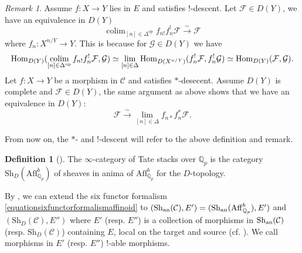 \documentclass[a4paper,10pt]{amsart}
\theoremstyle{remark}
\newtheorem{remark}[theorem]{Remark}
\theoremstyle{definition}
\newtheorem{definition}[theorem]{Definition}
\theoremstyle{plain}
\numberwithin{equation}{section}
\newcommand{\bbQ}{{\mathbb Q}}
\newcommand{\calC}{{\mathcal C}}
\newcommand{\calF}{{\mathcal F}}
\newcommand{\calG}{{\mathcal G}}
\newcommand{\an}{{\rm an}}
\newcommand{\Hom}{{\rm Hom}}
\newcommand{\AffQp}{{\mathrm{Aff}^b_{\mathbb{Q}_p}}}
\newcommand{\Sh}{{\mathrm{Sh}}}
\DeclareMathOperator{\colim}{colim}
\begin{document}
\begin{remark}\label{remarkDtopo}
	Assume $f:X\to Y$ lies in $E$ and satisfies $!$-descent. Let $\calF\in D(Y)$, we have an equivalence in $D(Y)$
	$$\colim_{[n]\in \Delta^{\mathrm{op}}} f_{n!}f_n^!\calF\stackrel{\sim}\longrightarrow \calF$$ 
	 where $f_n: X^{n/Y}\to Y$. This is because for $\calG\in D(Y)$ we have
	$$\Hom_{D(Y)}(\colim_{[n] \in \Delta^{\mathrm{op}}} f_{n!}f_n^!\calF,\calG)\simeq \lim_{[n] \in \Delta} \Hom_{D(X^{n/Y})}(f^!_n\calF,f^!_n\calG)\simeq \Hom_{D(Y)}(\calF,\calG).$$
	Let $f:X\to Y$ be a morphism in $\calC$ and satisfies $*$-desecent. Assume $D(Y)$ is complete and $\calF\in D(Y)$, the same argument as above shows that we have an equivalence in $D(Y)$:
	$$\calF\stackrel{\sim}\longrightarrow \lim_{[n] \in \Delta} f_{n*}f_n^*\calF.$$
\end{remark}
From now on, the $*$- and $!$-descent will refer to the above definition and remark.
\begin{definition}[{\cite[Def.~3.2.10]{camargo2024analytic}}]\label{definitionTatestack}
	The $\infty$-category of Tate stacks over $\bbQ_p$ is the category $\Sh_D(\AffQp)$ of sheaves in anima of $\AffQp$ for the $D$-topology.
\end{definition}


By \cite[Theorem 3.4.11]{heyer20246functor}, we can extend the six functor formalism \eqref{equationsixfunctorformalismaffinoid} to $(\Sh_{\an}(\calC),E')=(\Sh_{\an}(\AffQp),E')$ and $(\Sh_{D}(\calC),E'')$ where $E'$ (resp. $E''$) is a collection of morphisms in $\Sh_{\an}(\calC)$ (resp. $\Sh_{D}(\calC)$) containing $E$, local on the target and source (cf. \cite[Cor.~3.2.6]{camargo2024analytic}). We call morphisms in $E'$ (resp. $E''$) $!$-able morphisms.
\end{document}

